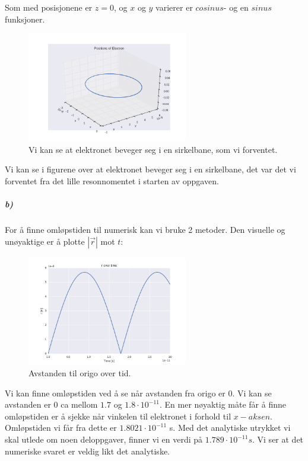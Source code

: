 \documentclass[a4paper,norsk, 10pt]{article}
\begin{document}
Som med posisjonene er $z = 0$, og $x$ og $y$ varierer er $cosinus$- og en $sinus$funksjoner.

\begin{figure}[H]
\begin{center}
\includegraphics[width = 70mm]{opp2Pos3d.png}
\caption{Vi kan se at elektronet beveger seg i en sirkelbane, som vi forventet.}
\end{center}
\end{figure}

Vi kan se i figurene over at elektronet beveger seg i en sirkelbane, det var det vi forventet fra det lille resonnomentet i starten av oppgaven.

\subparagraph*{b)}
For å finne omløpstiden til numerisk kan vi bruke 2 metoder. Den visuelle og unøyaktige er å plotte $|\vec{r}|$ mot $t$:

\begin{figure}[H]
\begin{center}
\includegraphics[width = 70mm]{opp2R2d.png}
\caption{Avstanden til origo over tid.}
\end{center}
\end{figure}

Vi kan finne omløpstiden ved å se når avstanden fra origo er 0. Vi kan se avstanden er 0 ca mellom $1.7$ og $1.8\cdot 10^{-11} $. En mer nøyaktig måte får å finne omløpstiden er å sjekke når vinkelen til elektronet i forhold til $x-aksen$. Omløpstiden vi får fra dette er $1.8021\cdot 10^{-11}$ s. Med det analytiske utrykket vi skal utlede om noen deloppgaver, finner vi en verdi på $1.789 \cdot 10^{-11} s$. Vi ser at det numeriske svaret er veldig likt det analytiske.
\end{document}
